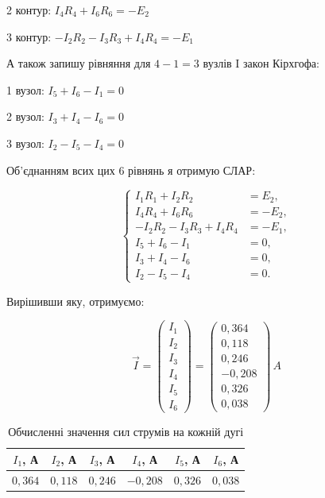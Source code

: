 \documentclass[12pt,a4paper]{article}
\begin{document}
    2 контур: $I_4R_4 + I_6R_6 = -E_2$
    \vspace{1em}

    3 контур: $-I_2R_2 - I_3R_3 + I_4R_4 = -E_1$
    \vspace{1em}

    А також запишу рівняння для $4-1 = 3$ вузлів I закон Кірхгофа:

    \vspace{1em}

    1 вузол: $I_5 + I_6 - I_1 = 0$

    \vspace{1em}

    2 вузол: $I_3 + I_4 - I_6 = 0$

    \vspace{1em}

    3 вузол: $I_2 - I_5 - I_4 = 0$

    Об'єднанням всих цих 6 рівнянь я отримую СЛАР:

    \[
    \left\{
    \begin{aligned}
    I_1 R_1 + I_2 R_2 &= E_2,\\
    I_4 R_4 + I_6 R_6 &= -E_2,\\
    -I_2 R_2 - I_3 R_3 + I_4 R_4 &= -E_1,\\
    I_5 + I_6 - I_1 &= 0,\\
    I_3 + I_4 - I_6 &= 0,\\
    I_2 - I_5 - I_4 &= 0.
    \end{aligned}
    \right.
    \]

    Вирішивши яку, отримуємо:

    \[
    \vec{I} =
    \begin{pmatrix}
    I_1\\ I_2\\ I_3\\ I_4\\ I_5\\ I_6
    \end{pmatrix}
    =
    \begin{pmatrix}
    0{,}364\\
    0{,}118\\
    0{,}246\\
    -0{,}208\\
    0{,}326\\
    0{,}038
    \end{pmatrix}\,A
    \]

    \begin{table}[h!]
        \centering
            \begin{tabular}{|c|c|c|c|c|c|}
            \hline
            $I_1$, А & $I_2$, А & $I_3$, А & $I_4$, А & $I_5$, А & $I_6$, А \\
            \hline
            $0{,}364$ & $0{,}118$ & $0{,}246$ & $-0{,}208$ & $0{,}326$ & $0{,}038$\\
            \hline
        \end{tabular}
        \caption{Обчисленні значення сил струмів на кожній дугі}
    \end{table}
\end{document}

